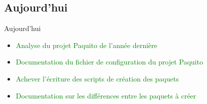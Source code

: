 \documentclass[11pt,xcolor=dvipsnames]{beamer}
\begin{document}
\subsection{Aujourd'hui}
\begin{frame}{Aujourd'hui}
\begin{itemize}
\item \textcolor{green}{Analyse du projet Paquito de l'année dernière}
\item \textcolor{green}{Documentation du fichier de configuration du projet Paquito}
\item \textcolor{green}{Achever l'écriture des scripts de création des paquets}
\item \textcolor{green}{Documentation sur les différences entre les paquets à créer}
\end{itemize}
\end{frame}
\end{document}
